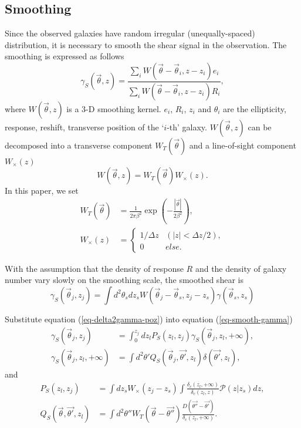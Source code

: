 \documentclass[twocolumn]{aastex62}
\newcommand{\vecb}[1]{{#1}}
\begin{document}
\subsection{Smoothing}
Since the observed galaxies have random irregular (unequally-spaced) distribution, it is necessary to smooth the shear signal in the observation. The smoothing is expressed as follows
\begin{equation}
\gamma_S  (\vec{\theta},z)  = \frac{\sum_i  W(\vec{\theta}-\vec{{\theta}}_i,z-z_i) e_i}{\sum_i W(\vec{\theta}-\vec{{\theta}}_i,z-z_i) R_i},
\end{equation}
where $W(\vec{\theta},z)$ is a $3$-D smoothing kernel. $e_i$, $R_i$, $z_i$ and $\theta_i$ are the ellipticity, response, reshift, transverse position of the `$i$-th' galaxy.
$W(\vec{\theta},z)$ can be decomposed into a transverse component $W_T(\vec{\theta})$ and a line-of-sight component $W_\times(z)$
\begin{equation}
W(\vec{\theta},z)=W_T(\vec{\theta}) W_\times (z).
\end{equation}
In this paper, we set
\begin{equation}
\begin{split}
W_T(\vec{\theta}) &=\frac{1}{2\pi\beta^2}\exp(-\frac{|\vec{\theta}|}{2\beta^2}),\\
W_\times (z) &=
\begin{cases}
1/\Delta z& (|z|<\Delta z/2),\\
0& else.
\end{cases}
\end{split}
\end{equation}

With the assumption that the density of response $R$ and the density of galaxy number vary slowly on the smoothing scale, the smoothed shear is
\begin{equation}\label{eq-smooth-gamma}
\gamma_S(\vec{\theta}_j,z_j)= \int d^2 \theta_s d z_sW(\vec{\theta}_j-\vec{{\theta}}_s,z_j-z_s) \gamma(\vec{\theta}_s,z_s)
\end{equation}

Substitute equation (\ref{eq-delta2gamma-poz}) into equation (\ref{eq-smooth-gamma})
\begin{equation}\label{eq-delta2gamma-smooth}
\begin{split}
\gamma_S(\vec{\theta}_j,z_j) &= \int_0^{z_j} dz_l P_S(z_l,z_j)\gamma_S(\vec{\theta}_j,z_l,+\infty),\\
\gamma_S(\vec{\theta}_j,z_l,+\infty)&= \int d^2 \theta'   Q_S(\vec{\theta}_j,\vec{\theta'},z_l) \delta(\vec{\theta'},z_l),
\end{split}
\end{equation}
and
\begin{equation}
\begin{split}
P_S(z_l,z_j)&=\int  dz_s W_\times (z_j-z_s) \int \frac{\delta_c(z_l,+\infty)}{\delta_{c}(z_l,z)} \mathcal{P}(z|z_s) dz,\\
Q_S(\vec{\theta},\vec{\theta'},z_l)&=\int d^2\theta'' W_T( \vec{\theta} -\vec{\theta''} )  \frac{\vecb{D}(\vec{\theta''}-\vec{\theta'})}{\delta_c(z_l,+\infty)}.
\end{split}
\end{equation}
\end{document}
